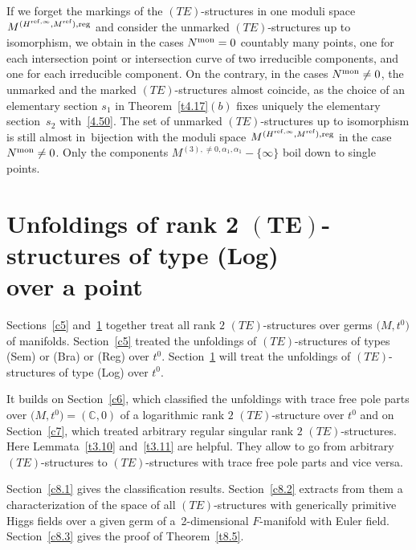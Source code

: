\documentclass[pdftex]{sigma}%
\numberwithin{equation}{section}
\numberwithin{figure}{section}
\newcommand{\C}{{\mathbb C}}
\begin{document}
{\sloppy\begin{Remark}%
If we forget the markings of the $(TE)$-structures in one
moduli space $M^{(H^{{\rm ref},\infty},M^{\rm ref}),{\rm reg}}$
and consider the unmarked $(TE)$-structures up to isomorphism,
we obtain in the cases $N^{\rm mon}=0$ countably many
points, one for each intersection point or intersection
curve of two irreducible components,
and one for each irreducible component.
On the contrary, in the cases $N^{\rm mon}\neq 0$,
the unmarked and the marked $(TE)$-structures almost coincide,
as the choice of an elementary section $s_1$ in
Theorem~\ref{t4.17}$(b)$ fixes uniquely the elementary
section~$s_2$ with~\eqref{4.50}.
The set of unmarked $(TE)$-structures up to isomorphism
is still almost in~bijec\-tion with the moduli space
$M^{(H^{{\rm ref},\infty},M^{\rm ref}),{\rm reg}}$ in the case $N^{\rm mon}\neq0$.
Only the components $M^{(3),\neq 0,\alpha_1,\alpha_1}-\{\infty\}$
boil down to single points.
\end{Remark}

}

\section[Unfoldings of rank 2 $(TE)$-structures of type (Log) over a point]
{Unfoldings of rank 2 $\boldsymbol{(TE)}$-structures of type (Log) \\over a point}\label{c8}

Sections~\ref{c5} and~\ref{c8} together
treat all rank $2$ $(TE)$-structures over germs $\big(M,t^0\big)$ of
manifolds. Section~\ref{c5} treated the unfoldings
of $(TE)$-structures of types (Sem) or (Bra) or (Reg)
over $t^0$.
Section~\ref{c8} will treat the unfoldings of
$(TE)$-structures of type (Log) over $t^0$.

It builds on Section~\ref{c6}, which classified the
unfoldings with trace free pole parts over
$\big(M,t^0\big)=(\C,0)$ of a logarithmic rank $2$ $(TE)$-structure
over $t^0$ and on Section~\ref{c7},
which treated arbitrary regular singular rank $2$
$(TE)$-structures.
Here Lemmata~\ref{t3.10} and~\ref{t3.11} are helpful.
They allow to go from arbitrary $(TE)$-structures
to $(TE)$-structures with trace free pole parts
and vice versa.

Section~\ref{c8.1} gives the classification results.
Section~\ref{c8.2} extracts from them a
characterization of the space of all $(TE)$-structures
with generically primitive Higgs fields over a given
germ of a~2-dimensional $F$-manifold with Euler field.
Section~\ref{c8.3} gives the proof of Theorem~\ref{t8.5}.
\end{document}
